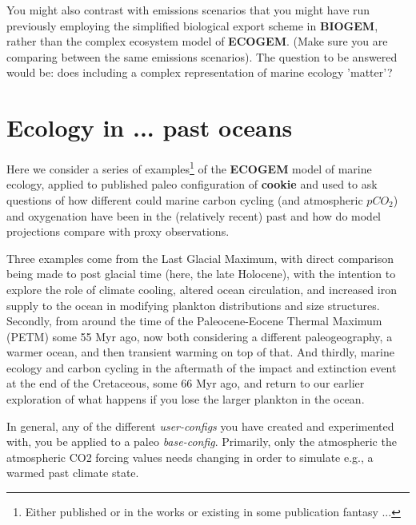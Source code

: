 \vspace{1mm}
\noindent You might also contrast with emissions scenarios that you might have run previously employing the simplified biological export scheme in \textbf{BIOGEM}, rather than the complex ecosystem model of \textbf{ECOGEM}. (Make sure you are comparing between the same emissions scenarios). The question to be answered would be: does including a complex representation of  marine ecology 'matter'?

\newpage

\section{Ecology in ... past oceans}

Here we consider a series of examples\footnote{Either published or in the works or existing in some publication fantasy ...} of the \textbf{ECOGEM} model of marine ecology, applied to published paleo configuration of \textbf{cookie} and used to ask questions of how different could marine carbon cycling (and atmospheric \(pCO_{2}\)) and oxygenation have been in the (relatively recent) past and how do model projections compare with proxy observations.

Three examples come  from the Last Glacial Maximum, with direct comparison being made to post glacial time (here, the late Holocene), with the intention to explore the role of climate cooling, altered ocean circulation, and increased iron supply to the ocean in modifying plankton distributions and size structures. Secondly, from around the time of the Paleocene-Eocene Thermal Maximum (PETM) some 55 Myr ago, now both considering a different paleogeography, a warmer ocean, and then transient warming on top of that. And thirdly, marine ecology and carbon cycling in the aftermath of the impact and extinction event at the end of the Cretaceous, some 66 Myr ago, and return to our earlier exploration of what happens if you lose the larger plankton in the ocean.

In general, any of the different \textit{user-configs} you have created and experimented with, you be applied to a paleo \textit{base-config}. Primarily, only the atmospheric the atmospheric CO2 forcing values needs changing in order to simulate e.g., a warmed past climate state.

\newpage
%
